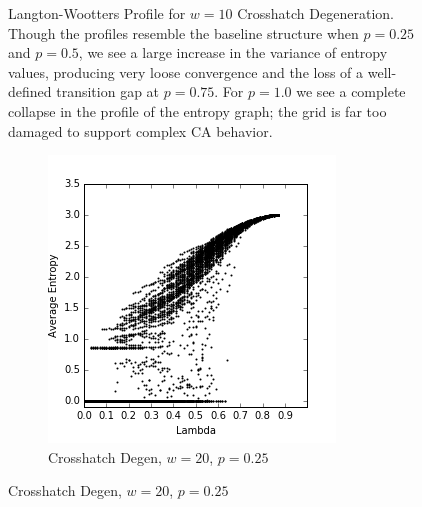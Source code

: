 \documentclass[a4paper,11pt]{report}
\begin{document}
\begin{figure}[htp]
\caption[Crosshatch Langton-Wootters Profile, $w=10$]{
  Langton-Wootters Profile for $w=10$ Crosshatch Degeneration. Though the profiles resemble the baseline structure when $p=0.25$ and $p=0.5$, we see a large increase in the variance of entropy values, producing very loose convergence and the loss of a well-defined transition gap at $p=0.75$. For $p=1.0$ we see a complete collapse in the profile of the entropy graph; the grid is far too damaged to support complex CA behavior.
}
\label{fig:lw_ch_10}
\end{figure}

\begin{figure}[htp]
\centering
\begin{subfigure}[t]{0.4\textwidth}
  \includegraphics[width=\textwidth]{ch6_figs/ch_w20_p25_entropy_scatter}
  \caption{Crosshatch Degen, $w=20$, $p=0.25$}


\end{subfigure}
\end{figure}
\end{document}
